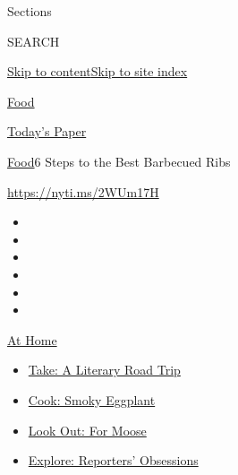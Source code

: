 Sections

SEARCH

\protect\hyperlink{site-content}{Skip to
content}\protect\hyperlink{site-index}{Skip to site index}

\href{https://www.nytimes3xbfgragh.onion/section/food}{Food}

\href{https://myaccount.nytimes3xbfgragh.onion/auth/login?response_type=cookie\&client_id=vi}{}

\href{https://www.nytimes3xbfgragh.onion/section/todayspaper}{Today's
Paper}

\href{/section/food}{Food}\textbar{}6 Steps to the Best Barbecued Ribs

\url{https://nyti.ms/2WUm17H}

\begin{itemize}
\item
\item
\item
\item
\item
\item
\end{itemize}

\href{https://www.nytimes3xbfgragh.onion/spotlight/at-home?action=click\&pgtype=Article\&state=default\&region=TOP_BANNER\&context=at_home_menu}{At
Home}

\begin{itemize}
\tightlist
\item
  \href{https://www.nytimes3xbfgragh.onion/2020/07/28/books/time-for-a-literary-road-trip.html?action=click\&pgtype=Article\&state=default\&region=TOP_BANNER\&context=at_home_menu}{Take:
  A Literary Road Trip}
\item
  \href{https://www.nytimes3xbfgragh.onion/2020/07/29/magazine/bored-with-your-home-cooking-some-smoky-eggplant-will-fix-that.html?action=click\&pgtype=Article\&state=default\&region=TOP_BANNER\&context=at_home_menu}{Cook:
  Smoky Eggplant}
\item
  \href{https://www.nytimes3xbfgragh.onion/2020/07/27/travel/moose-michigan-isle-royale.html?action=click\&pgtype=Article\&state=default\&region=TOP_BANNER\&context=at_home_menu}{Look
  Out: For Moose}
\item
  \href{https://www.nytimes3xbfgragh.onion/interactive/2020/at-home/even-more-reporters-editors-diaries-lists-recommendations.html?action=click\&pgtype=Article\&state=default\&region=TOP_BANNER\&context=at_home_menu}{Explore:
  Reporters' Obsessions}
\end{itemize}

